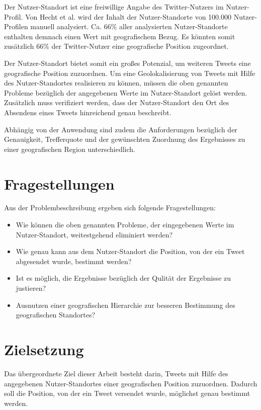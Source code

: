 		Der Nutzer-Standort ist eine freiwillige Angabe des Twitter-Nutzers im Nutzer-Profil. 
		Von Hecht et al. \cite{Hecht2011} wird der Inhalt der Nutzer-Standorte von 100.000 Nutzer-Profilen manuell analysiert.
	    Ca. 66\% aller analysierten Nutzer-Standorte enthalten demnach einen Wert mit geografischem Bezug.
	    Es könnten somit zusätzlich 66\% der Twitter-Nutzer eine geografische Position zugeordnet. 

	    Der Nutzer-Standort bietet somit ein großes Potenzial, um weiteren Tweets eine geografische Position zuzuordnen.
	    Um eine Geolokalisierung von Tweets mit Hilfe des Nutzer-Standortes realisieren zu können, müssen die oben genannten Probleme bezüglich der angegebenen Werte im Nutzer-Standort gelöst werden.
	    Zusätzlich muss verifiziert werden, dass der Nutzer-Standort den Ort des Absendens eines Tweets hinreichend genau beschreibt.

	    Abhängig von der Anwendung sind zudem die Anforderungen bezüglich der Genauigkeit, Trefferquote und der gewünschten Zuordnung des Ergebnisses zu einer geografischen Region unterschiedlich. 

	    \newpage

	  \section{Fragestellungen}

	  	Aus der Problembeschreibung ergeben sich folgende Fragestellungen:  

	  	\begin{itemize}
	  		\item Wie können die oben genannten Probleme, der eingegebenen Werte im Nutzer-Standort, weitestgehend eliminiert werden?
	  		\item Wie genau kann aus dem Nutzer-Standort die Position, von der ein Tweet abgesendet wurde, bestimmt werden? 
			\item Ist es möglich, die Ergebnisse bezüglich der Qulität der Ergebnisse zu justieren?
			\item Ausnutzen einer geografischen Hierarchie zur besseren Bestimmung des geografischen Standortes? 
	  	\end{itemize}

	\section{Zielsetzung} \label{sec:Zielsetzung} 

		Das übergeordnete Ziel dieser Arbeit besteht darin, Tweets mit Hilfe des angegebenen Nutzer-Standortes einer geografischen Position zuzuordnen.
		Dadurch soll die Position, von der ein Tweet versendet wurde, möglichst genau bestimmt werden.

